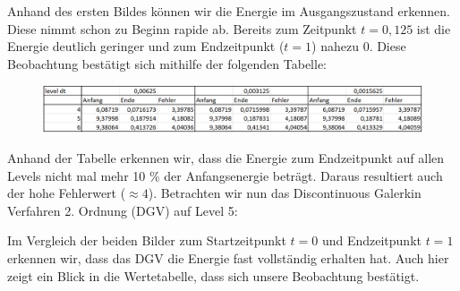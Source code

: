 Anhand des ersten Bildes können wir die Energie im Ausgangszustand erkennen. Diese nimmt schon zu Beginn rapide ab. Bereits zum Zeitpunkt $t = 0,125$ ist die Energie deutlich geringer und zum Endzeitpunkt ($t=1$) nahezu $0$. Diese
Beobachtung bestätigt sich mithilfe der folgenden Tabelle:

\begin{figure}[H]
	\centering
	\includegraphics[width=\textwidth]{../Aufgabe21/deg=0CircleWaveEnergieTabelle.png}
\end{figure}

Anhand der Tabelle erkennen wir, dass die Energie zum Endzeitpunkt auf allen Levels nicht mal mehr 10 \% der Anfangsenergie beträgt. Daraus resultiert auch der hohe Fehlerwert ($\approx 4$). 
Betrachten wir nun das Discontinuous Galerkin Verfahren 2. Ordnung (DGV) auf Level 5:

\begin{figure}[H]
	\centering
\end{figure}

Im Vergleich der beiden Bilder zum Startzeitpunkt $t=0$ und Endzeitpunkt $t=1$ erkennen wir, dass das DGV die Energie fast vollständig erhalten hat. Auch hier zeigt ein Blick in die Wertetabelle, dass sich unsere Beobachtung bestätigt.

